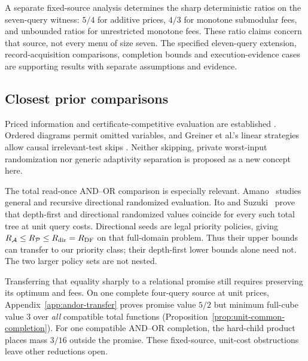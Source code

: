 \documentclass[pdflatex,sn-mathphys-num]{sn-jnl}
\theoremstyle{thmstyleone}
\theoremstyle{thmstylethree}
\theoremstyle{thmstyletwo}
\begin{document}
A separate fixed-source analysis determines the sharp deterministic
ratios on the seven-query witness: $5/4$ for additive prices, $4/3$ for
monotone submodular fees, and unbounded ratios for unrestricted monotone
fees. These ratio claims concern that source, not every menu of size seven.
The specified eleven-query extension, record-acquisition comparisons,
completion bounds and execution-evidence cases are supporting results
with separate assumptions and evidence.

\subsection{Closest prior comparisons}
Priced information and certificate-competitive evaluation are established
\cite{charikar02,cicalese14}. Ordered diagrams permit omitted variables,
and Greiner et al.'s linear strategies allow causal irrelevant-test skips
\cite{greiner}. Neither skipping, private worst-input randomization nor
generic adaptivity separation is proposed as a new concept here.

The total read-once AND--OR comparison is especially relevant.
Amano~\cite{amano2011directional} studies general and recursive directional
randomized evaluation. Ito and Suzuki~\cite{itosuzuki2025collapse} prove
that depth-first and directional randomized values coincide for every
such total tree at unit query costs. Directional seeds are legal priority
policies, giving $R_{\mathcal A}\le R_{\mathcal P}\le R_{\rm dir}=R_{\rm DF}$
on that full-domain problem. Thus their upper bounds can transfer to our
priority class; their depth-first lower bounds alone need not.
The two larger policy sets are not nested.

Transferring that equality sharply to a relational promise still requires
preserving its optimum and fees. On one complete four-query source at unit
prices, Appendix~\ref{app:andor-transfer} proves promise value $5/2$ but
minimum full-cube value $3$ over \emph{all} compatible total functions
(Proposition~\ref{prop:unit-common-completion}). For one compatible AND--OR
completion, the hard-child product places mass $3/16$ outside the promise.
These fixed-source, unit-cost obstructions leave other reductions open.
\end{document}
